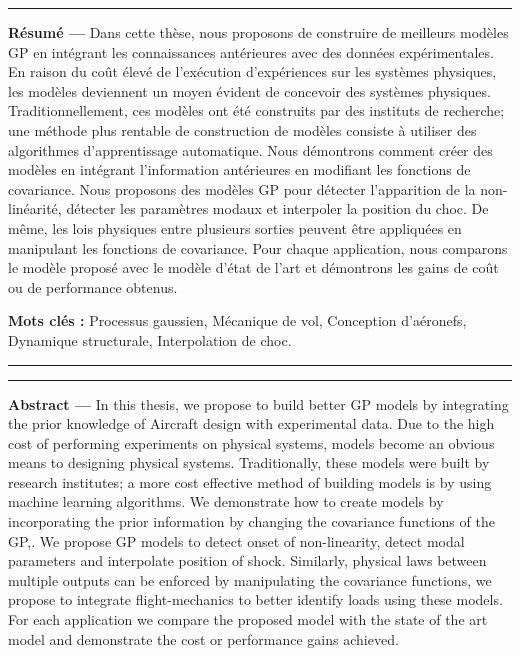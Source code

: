 \begin{vcenterpage}

\noindent\rule[2pt]{\textwidth}{0.5pt}

{\large\textbf{Résumé ---}}
Dans cette thèse, nous proposons de construire de meilleurs modèles GP en intégrant les connaissances antérieures avec des données expérimentales. En raison du coût élevé de l'exécution d'expériences sur les systèmes physiques, les modèles deviennent un moyen évident de concevoir des systèmes physiques. Traditionnellement, ces modèles ont été construits par des instituts de recherche; une méthode plus rentable de construction de modèles consiste à utiliser des algorithmes d'apprentissage automatique. Nous démontrons comment créer des modèles en intégrant l'information antérieures en modifiant les fonctions de covariance. Nous proposons des modèles GP pour détecter l'apparition de la non-linéarité, détecter les paramètres modaux et interpoler la position du choc. De même, les lois physiques entre plusieurs sorties peuvent être appliquées en manipulant les fonctions de covariance. Pour chaque application, nous comparons le modèle proposé avec le modèle d'état de l'art et démontrons les gains de coût ou de performance obtenus.

{\large\textbf{Mots clés :}}
    Processus gaussien, Mécanique de vol, Conception d'aéronefs, Dynamique structurale, Interpolation de choc.
\\
\noindent\rule[2pt]{\textwidth}{0.5pt}

\vspace{0.5cm}

\noindent\rule[2pt]{\textwidth}{0.5pt}
{\large\textbf{Abstract ---}}
In this thesis, we propose to build better GP models by integrating the prior knowledge of Aircraft design with experimental data. Due to the high cost of performing experiments on physical systems, models become an obvious means to designing physical systems. Traditionally, these models were built by research institutes; a more cost effective method of building models is by using machine learning algorithms. We demonstrate how to create models by incorporating the prior information by changing the covariance functions of the GP,. We propose GP models to detect onset of non-linearity, detect modal parameters and interpolate position of shock. Similarly, physical laws between multiple outputs can be enforced by manipulating the covariance functions, we propose to integrate flight-mechanics to better identify loads using these models. For each application we compare the proposed model with the state of the art model and demonstrate the cost or performance gains achieved. 


\end{vcenterpage}
